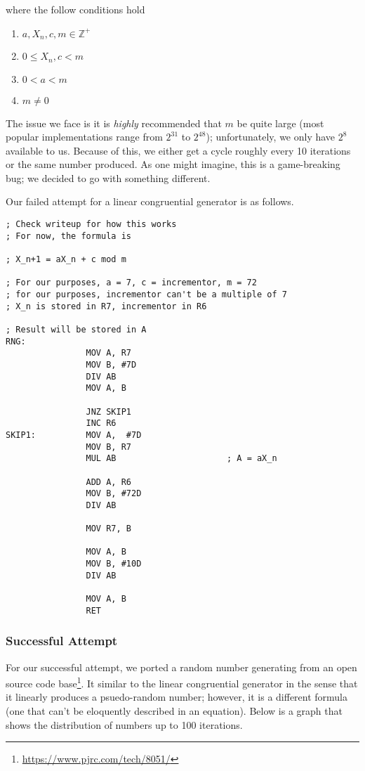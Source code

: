 \documentclass[12pt]{article}
\begin{document}
\noindent where the follow conditions hold

\begin{enumerate}
    \item $a, X_n, c, m \in \mathbb{Z}^+$
    \item $0 \leq X_n, c < m$
    \item $0 < a < m$
    \item $m \neq 0$
\end{enumerate}

The issue we face is it is \textit{highly} recommended that $m$ be quite large (most popular implementations range from $2^{31}$ to $2^{48}$); unfortunately, we only have $2^8$ available to us. Because of this, we either get a cycle roughly every \num{10} iterations or the same number produced. As one might imagine, this is a game-breaking bug; we decided to go with something different.

Our failed attempt for a linear congruential generator is as follows.

\begin{verbatim}
; Check writeup for how this works
; For now, the formula is

; X_n+1 = aX_n + c mod m

; For our purposes, a = 7, c = incrementor, m = 72
; for our purposes, incrementor can't be a multiple of 7
; X_n is stored in R7, incrementor in R6

; Result will be stored in A
RNG:
                MOV A, R7
                MOV B, #7D
                DIV AB
                MOV A, B

                JNZ SKIP1
                INC R6
SKIP1:          MOV A,  #7D
                MOV B, R7
                MUL AB                      ; A = aX_n

                ADD A, R6
                MOV B, #72D
                DIV AB

                MOV R7, B

                MOV A, B
                MOV B, #10D
                DIV AB

                MOV A, B
                RET
\end{verbatim}

\subsubsection{Successful Attempt}
For our successful attempt, we ported a random number generating from an open source code base\footnote{\url{https://www.pjrc.com/tech/8051/}}. It similar to the linear congruential generator in the sense that it linearly produces a psuedo-random number; however, it is a different formula (one that can't be eloquently described in an equation). Below is a graph that shows the distribution of numbers up to \num{100} iterations.
\end{document}
